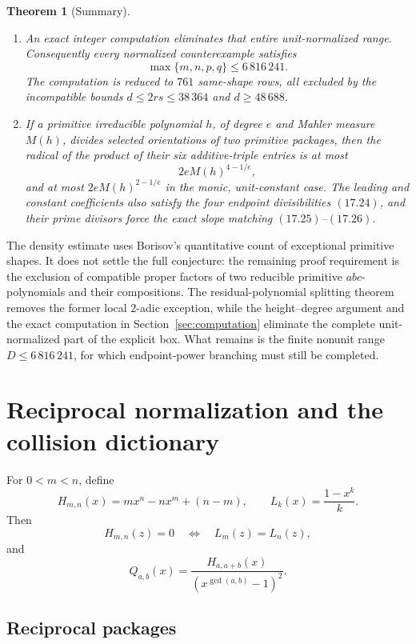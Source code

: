 \documentclass[11pt]{article}
\newtheorem{theorem}{Theorem}[section]
\theoremstyle{definition}
\begin{document}
\begin{theorem}[Summary]
\begin{enumerate}[label=(\roman*)]
\item An exact integer computation eliminates that entire unit-normalized
range.  Consequently every normalized counterexample satisfies
\[
 \boxed{\max\{m,n,p,q\}\leq6\,816\,241.}
\]
The computation is reduced to \(761\) same-shape rows, all excluded by the
incompatible bounds \(d\leq2rs\leq38\,364\) and \(d\geq48\,688\).

\item If a primitive irreducible polynomial \(h\), of degree \(e\) and
Mahler measure \(M(h)\), divides selected orientations of two primitive
packages, then the radical of the product of their six additive-triple
entries is at most
\[
 2eM(h)^{4-1/e},
\]
and at most \(2eM(h)^{2-1/e}\) in the monic, unit-constant case.  The
leading and constant coefficients also satisfy the four endpoint
divisibilities \((17.24)\), and their prime divisors force the exact slope
matching \((17.25)\)--\((17.26)\).
\end{enumerate}
\end{theorem}

The density estimate uses Borisov's quantitative count of exceptional
primitive shapes.  It does not settle the full conjecture: the remaining
proof requirement is the exclusion of compatible proper factors of two
reducible primitive \(abc\)-polynomials and their compositions.  The
residual-polynomial splitting theorem removes the former local \(2\)-adic
exception, while the height--degree argument and the exact computation in
Section~\ref{sec:computation} eliminate the complete unit-normalized part of
the explicit box.  What remains is the finite nonunit range
\(D\leq6\,816\,241\), for which endpoint-power branching must still be
completed.

\section{Reciprocal normalization and the collision dictionary}
\label{sec:dictionary}

For \(0<m<n\), define
\[
 H_{m,n}(x)=mx^n-nx^m+(n-m),
 \qquad
 L_k(x)=\frac{1-x^k}{k}.
\]
Then
\begin{equation}
 H_{m,n}(z)=0
 \quad\Longleftrightarrow\quad
 L_m(z)=L_n(z),
 \tag{2.1}
\end{equation}
and
\begin{equation}
 Q_{a,b}(x)=
 \frac{H_{a,a+b}(x)}{(x^{\gcd(a,b)}-1)^2}.
 \tag{2.2}
\end{equation}

\subsection{Reciprocal packages}
\end{document}

